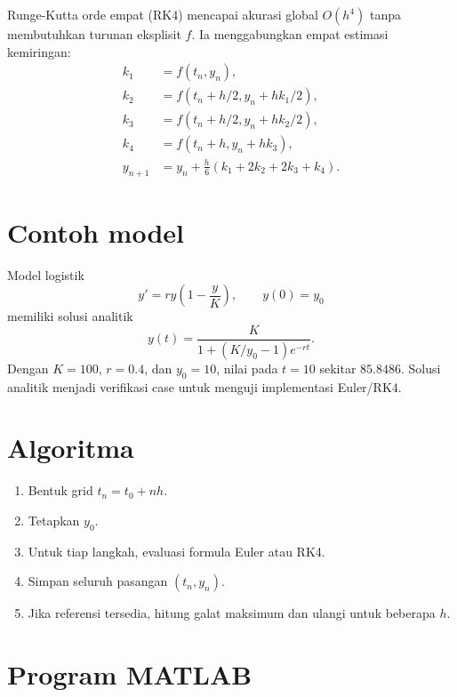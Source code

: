 \documentclass[book,english,noindex,lean,nobackpage,nocopyright,noupdate,nofiglist,notablist]{enacom}
\begin{document}
Runge-Kutta orde empat (RK4) mencapai akurasi global $O(h^4)$ tanpa membutuhkan turunan eksplisit $f$. Ia menggabungkan empat estimasi kemiringan:
\begin{align}
k_1&=f(t_n,y_n),\\
k_2&=f(t_n+h/2,y_n+hk_1/2),\\
k_3&=f(t_n+h/2,y_n+hk_2/2),\\
k_4&=f(t_n+h,y_n+hk_3),\\
y_{n+1}&=y_n+\frac{h}{6}(k_1+2k_2+2k_3+k_4).
\end{align}

\section{Contoh model}
Model logistik
\begin{equation}
y'=r y\left(1-\frac{y}{K}\right),\qquad y(0)=y_0
\end{equation}
memiliki solusi analitik
\begin{equation}
y(t)=\frac{K}{1+(K/y_0-1)e^{-rt}}.
\end{equation}
Dengan $K=100$, $r=0.4$, dan $y_0=10$, nilai pada $t=10$ sekitar $85.8486$. Solusi analitik menjadi verifikasi case untuk menguji implementasi Euler/RK4.

\section{Algoritma}
\begin{enumerate}
\item Bentuk grid $t_n=t_0+nh$.
\item Tetapkan $y_0$.
\item Untuk tiap langkah, evaluasi formula Euler atau RK4.
\item Simpan seluruh pasangan $(t_n,y_n)$.
\item Jika referensi tersedia, hitung galat maksimum dan ulangi untuk beberapa $h$.
\end{enumerate}

\section{Program MATLAB}



\end{document}
